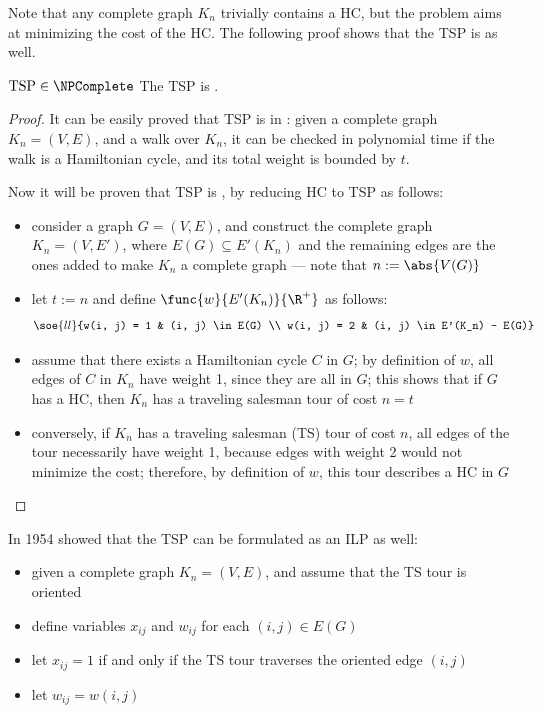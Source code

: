 \documentclass[a4paper, 12pt]{report}
\begin{document}
    Note that any complete graph $K_n$ trivially contains a HC, but the problem aims at minimizing the cost of the HC. The following proof shows that the TSP is \NPComplete as well.

    \begin{framedthm}[label={tsp np compl}]{$\mathrm{TSP} \in \NPComplete$}
        The TSP is \NPComplete.
    \end{framedthm}

    \begin{proof}
        It can be easily proved that TSP is in \NPclass: given a complete graph $K_n =(V, E)$, and a walk over $K_n$, it can be checked in polynomial time if the walk is a Hamiltonian cycle, and its total weight is bounded by $t$.

        Now it will be proven that TSP is \NPHard, by reducing HC to TSP as follows:

        \begin{itemize}
            \item consider a graph $G = (V, E)$, and construct the complete graph $K_n = (V, E')$, where $E(G) \subseteq E'(K_n)$ and the remaining edges are the ones added to make $K_n$ a complete graph --- note that $n := \abs{V(G)}$
            \item let $t := n$ and define $\func{w}{E'(K_n)}{\R^+}$ as follows: $$\soe{ll}{w(i, j) = 1 & (i, j) \in E(G) \\ w(i, j) = 2 & (i, j) \in E'(K_n) - E(G)}$$
            \item assume that there exists a Hamiltonian cycle $C$ in $G$; by definition of $w$, all edges of $C$ in $K_n$ have weight 1, since they are all in $G$; this shows that if $G$ has a HC, then $K_n$ has a traveling salesman tour of cost $n = t$
            \item conversely, if $K_n$ has a traveling salesman (TS) tour of cost $n$, all edges of the tour necessarily have weight 1, because edges with weight 2 would not minimize the cost; therefore, by definition of $w$, this tour describes a HC in $G$
            \end{itemize}
    \end{proof}

    In 1954 \textcite{dantzig} showed that the TSP can be formulated as an ILP as well:

    \begin{itemize}
        \item given a complete graph $K_n = (V, E)$, and assume that the TS tour is oriented
        \item define variables $x_{ij}$ and $w_{ij}$ for each $(i, j) \in E(G)$
        \item let $x_{ij} = 1$ if and only if the TS tour traverses the oriented edge $(i, j)$
        \item let $w_{ij} = w(i, j)$
    \end{itemize}
\end{document}
